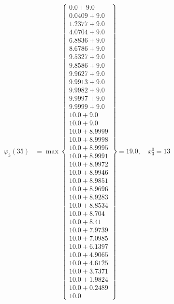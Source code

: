 \documentclass{article}
\begin{document}
\begin{align*}
\varphi_{3}(35) &= \max \left\{ \begin{array}{c}
0.0 + 9.0 \\
 0.0409 + 9.0 \\
 1.2377 + 9.0 \\
 4.0704 + 9.0 \\
 6.8836 + 9.0 \\
 8.6786 + 9.0 \\
 9.5327 + 9.0 \\
 9.8586 + 9.0 \\
 9.9627 + 9.0 \\
 9.9913 + 9.0 \\
 9.9982 + 9.0 \\
 9.9997 + 9.0 \\
 9.9999 + 9.0 \\
 10.0 + 9.0 \\
 10.0 + 9.0 \\
 10.0 + 8.9999 \\
 10.0 + 8.9998 \\
 10.0 + 8.9995 \\
 10.0 + 8.9991 \\
 10.0 + 8.9972 \\
 10.0 + 8.9946 \\
 10.0 + 8.9851 \\
 10.0 + 8.9696 \\
 10.0 + 8.9283 \\
 10.0 + 8.8534 \\
 10.0 + 8.704 \\
 10.0 + 8.41 \\
 10.0 + 7.9739 \\
 10.0 + 7.0985 \\
 10.0 + 6.1397 \\
 10.0 + 4.9065 \\
 10.0 + 4.6125 \\
 10.0 + 3.7371 \\
 10.0 + 1.9824 \\
 10.0 + 0.2489 \\
 10.0
\end{array} \right\}=19.0, \quad x_{3}^0=13\\
  

\end{align*}
\end{document}
